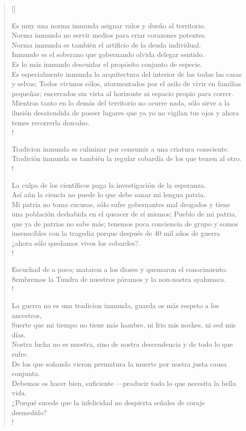 \documentclass[11pt, a4paper]{article} %
\newcommand{\poemauthorright}[1]{\nopagebreak{\raggedleft\footnotesize\textsc{#1}\par}} %
\begin{document}
\begin{verse}[\versewidth]
{Es muy una norma inmunda asignar valor y dueño al territorio. \\
Norma inmunda no servir medios para criar corazones potentes. \\
Norma inmunda es también el artificio de la deuda individual. \\
Inmundo es el soberano que gobernando olvida delegar sentido.\\
Es lo más inmundo descuidar el propósito conjunto de especie.\\
Es especialmente inmunda la arquitectura del interior de las todas las casas y selvas; Todos vivimos sólos, 
atormentados por el asilo de vivir en familias pequeñas; encerrados sin vista al horizonte ni espacio 
propio para correr. Mientras tanto en lo demás del territorio no ocurre nada, sólo sirve a la ilusión 
desatendida de poseer lugares que ya yo no vigilan tus ojos y ahora temes recorrerla dezcalso.\\!

Tradicion inmunda es culminar por consumir a una criatura consciente. \\
Tradición inmunda es también la regular cobardía de los que temen al otro. \\!

La culpa de los científicos paga la investigación de la esperanza. \\
Así aún la ciencia no puede lo que debe sanar mi lengua patria. \\  
Mi patria no toma excusas, sólo sufre gobernantes mal drogados y tiene una 
población deshabida en el queacer de sí mismos; Pueblo de mi patria, que ya de 
patrias no sabe más; tenemos poca conciencia de grupo y somos insenscibles con 
la tragedia porque después de 40 mil años de guerra ¿ahora sólo quedamos vivos los cobardes?.\\!

Escuchad de a poco; mataron a los dioses y quemaron el conocimiento. \\
Sembremos la Tundra de nuestros páramos y la non-nostra ayahuasca.\\!

La guerra no es una tradicion inmunda, guarda os más respeto a los ancestros, \\
Suerte que mi tiempo no tiene más hambre, ni frio mis noches, ni sed mis días. \\
Nostra lucha no es nuestra, sino de nostra descendencia y de todo lo que sufre. \\

De los que soñando vieron prematura la muerte por nostra justa causa conjunta. \\
Debemos os hacer bien, suficiente ---producir todo lo que necesita la bella vida. \\
¿Porqué sucede que la infelicidad no despierta señales de coraje desmedido? \\!

}
\end{verse}


\poemauthorright{FUNDACIÓN DE FUENTE LIBRE WAAJACU} %

\end{document}
